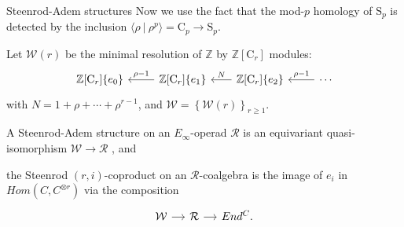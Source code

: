 \documentclass[10pt,t]{beamer} %
\renewcommand{\S}{\mathrm{S}}
\newcommand{\C}{\mathrm{C}}
\begin{document}
\begin{frame}[fragile]{Steenrod-Adem structures}
	Now we use the fact that the mod-$p$ homology of $\S_p$ is detected by the inclusion $\langle \rho\ |\ \rho^p\rangle = \C_p \to \S_p$.
	
	\pause \vspace*{10pt}
	
	Let $\mathcal W(r)$ be the minimal resolution of $\mathbb{Z}$ by $\mathbb{Z}[\C_r]$ modules:
	\begin{equation*}
	\begin{tikzcd}[column sep=normal]
	\mathbb{Z}[\C_r]\{e_0\} & \arrow[l, "\rho-1"'] \mathbb{Z}[\C_r]\{e_1\} &[-5pt] \arrow[l, "N"']
	\mathbb{Z}[\C_r]\{e_2\} & \arrow[l, "\rho-1"'] \cdots
	\end{tikzcd}
	\end{equation*}
	with $N = 1+\rho+\cdots+\rho^{r-1}$, and $\mathcal{W} = \left\{\mathcal{W}(r)\right\}_{r \geq 1}$.
	
	\pause \vspace*{10pt}
	
	A \textcolor{pblue}{Steenrod-Adem structure} on an $E_\infty$-operad $\mathcal R$ is an equivariant quasi-isomorphism $\mathcal W \to \mathcal R$ \pause, and
	
	\vspace*{10pt}
	
	the \textcolor{pblue}{Steenrod $(r, i)$-coproduct} on an $\mathcal R$-coalgebra is the image
	of $e_i$ in $Hom(C, C^{\otimes r})$ via the composition	
	\begin{equation*}
	\begin{tikzcd}[column sep=small]
	\mathcal W \arrow[r] & \mathcal R \arrow[r] & End^C.
	\end{tikzcd}
	\end{equation*}		
\end{frame}
\end{document}
